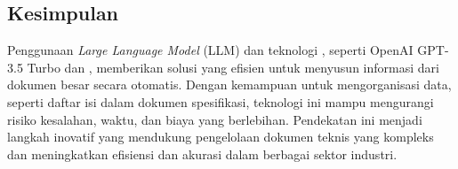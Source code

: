 \subsection{Kesimpulan}

Penggunaan \emph{Large Language Model} (LLM) dan teknologi \cv, seperti OpenAI GPT-3.5 Turbo dan \donut, memberikan solusi yang efisien untuk menyusun informasi dari dokumen besar secara otomatis. Dengan kemampuan untuk mengorganisasi data, seperti daftar isi dalam dokumen spesifikasi, teknologi ini mampu mengurangi risiko kesalahan, waktu, dan biaya yang berlebihan. Pendekatan ini menjadi langkah inovatif yang mendukung pengelolaan dokumen teknis yang kompleks dan meningkatkan efisiensi dan akurasi dalam berbagai sektor industri. 